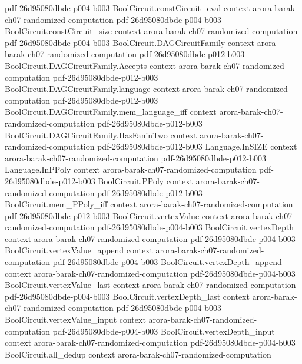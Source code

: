 \begin{theorem}
  {pdf-26d95080dbde-p004-b003}
\proofstep
  {BoolCircuit.constCircuit_eval}
  {context}
  {arora-barak-ch07-randomized-computation}
  {pdf-26d95080dbde-p004-b003}
\proofstep
  {BoolCircuit.constCircuit_size}
  {context}
  {arora-barak-ch07-randomized-computation}
  {pdf-26d95080dbde-p004-b003}
\proofstep
  {BoolCircuit.DAGCircuitFamily}
  {context}
  {arora-barak-ch07-randomized-computation}
  {pdf-26d95080dbde-p012-b003}
\proofstep
  {BoolCircuit.DAGCircuitFamily.Accepts}
  {context}
  {arora-barak-ch07-randomized-computation}
  {pdf-26d95080dbde-p012-b003}
\proofstep
  {BoolCircuit.DAGCircuitFamily.language}
  {context}
  {arora-barak-ch07-randomized-computation}
  {pdf-26d95080dbde-p012-b003}
\proofstep
  {BoolCircuit.DAGCircuitFamily.mem_language_iff}
  {context}
  {arora-barak-ch07-randomized-computation}
  {pdf-26d95080dbde-p012-b003}
\proofstep
  {BoolCircuit.DAGCircuitFamily.HasFaninTwo}
  {context}
  {arora-barak-ch07-randomized-computation}
  {pdf-26d95080dbde-p012-b003}
\proofstep
  {Language.InSIZE}
  {context}
  {arora-barak-ch07-randomized-computation}
  {pdf-26d95080dbde-p012-b003}
\proofstep
  {Language.InPPoly}
  {context}
  {arora-barak-ch07-randomized-computation}
  {pdf-26d95080dbde-p012-b003}
\proofstep
  {BoolCircuit.PPoly}
  {context}
  {arora-barak-ch07-randomized-computation}
  {pdf-26d95080dbde-p012-b003}
\proofstep
  {BoolCircuit.mem_PPoly_iff}
  {context}
  {arora-barak-ch07-randomized-computation}
  {pdf-26d95080dbde-p012-b003}
\proofstep
  {BoolCircuit.vertexValue}
  {context}
  {arora-barak-ch07-randomized-computation}
  {pdf-26d95080dbde-p004-b003}
\proofstep
  {BoolCircuit.vertexDepth}
  {context}
  {arora-barak-ch07-randomized-computation}
  {pdf-26d95080dbde-p004-b003}
\proofstep
  {BoolCircuit.vertexValue_append}
  {context}
  {arora-barak-ch07-randomized-computation}
  {pdf-26d95080dbde-p004-b003}
\proofstep
  {BoolCircuit.vertexDepth_append}
  {context}
  {arora-barak-ch07-randomized-computation}
  {pdf-26d95080dbde-p004-b003}
\proofstep
  {BoolCircuit.vertexValue_last}
  {context}
  {arora-barak-ch07-randomized-computation}
  {pdf-26d95080dbde-p004-b003}
\proofstep
  {BoolCircuit.vertexDepth_last}
  {context}
  {arora-barak-ch07-randomized-computation}
  {pdf-26d95080dbde-p004-b003}
\proofstep
  {BoolCircuit.vertexValue_input}
  {context}
  {arora-barak-ch07-randomized-computation}
  {pdf-26d95080dbde-p004-b003}
\proofstep
  {BoolCircuit.vertexDepth_input}
  {context}
  {arora-barak-ch07-randomized-computation}
  {pdf-26d95080dbde-p004-b003}
\proofstep
  {BoolCircuit.all_dedup}
  {context}
  {arora-barak-ch07-randomized-computation}

\end{theorem}
